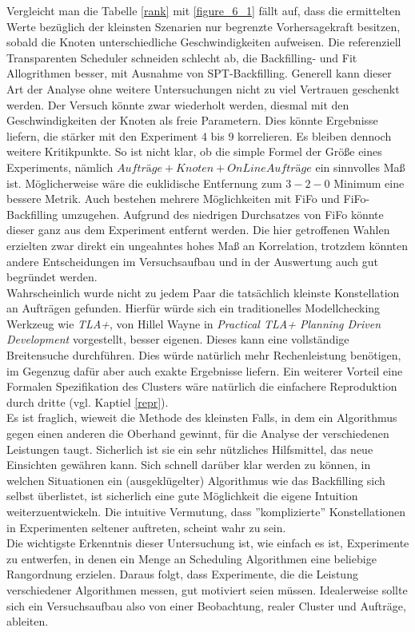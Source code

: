 Vergleicht man die Tabelle \ref{rank} mit \ref{figure_6_1} fällt auf, dass die ermittelten Werte bezüglich der kleinsten Szenarien nur begrenzte Vorhersagekraft besitzen, sobald die Knoten unterschiedliche Geschwindigkeiten aufweisen. Die referenziell Transparenten Scheduler schneiden schlecht ab, die Backfilling- und Fit Allogrithmen besser, mit Ausnahme von SPT-Backfilling. Generell kann dieser Art der Analyse ohne weitere Untersuchungen nicht zu viel Vertrauen geschenkt werden. Der Versuch könnte zwar wiederholt werden, diesmal mit den Geschwindigkeiten der Knoten als freie Parametern. Dies könnte Ergebnisse liefern, die stärker mit den Experiment 4 bis 9 korrelieren. Es bleiben dennoch weitere Kritikpunkte. So ist nicht klar, ob die simple Formel der Größe eines Experiments, nämlich $Aufträge + Knoten + OnLine Aufträge$ ein sinnvolles Maß ist. Möglicherweise wäre die euklidische Entfernung zum $3-2-0$ Minimum eine bessere Metrik. Auch bestehen mehrere Möglichkeiten mit FiFo und FiFo-Backfilling umzugehen. Aufgrund des niedrigen Durchsatzes von FiFo könnte dieser ganz aus dem Experiment entfernt werden. Die hier getroffenen Wahlen erzielten zwar direkt ein ungeahntes hohes Maß an Korrelation, trotzdem könnten andere Entscheidungen im Versuchsaufbau und in der Auswertung auch gut begründet werden.\\
Wahrscheinlich wurde nicht zu jedem Paar die tatsächlich kleinste Konstellation an Aufträgen gefunden. Hierfür würde sich ein traditionelles Modellchecking Werkzeug wie \emph{TLA+}, von Hillel Wayne in \emph{Practical TLA+ Planning Driven Development} \cite{Wayne2018} vorgestellt, besser eigenen.  Dieses kann eine vollständige Breitensuche durchführen. Dies würde natürlich mehr Rechenleistung benötigen, im Gegenzug dafür aber auch exakte Ergebnisse liefern. Ein weiterer Vorteil eine Formalen Spezifikation des Clusters wäre natürlich die einfachere Reproduktion durch dritte (vgl. Kaptiel \ref{repr}).\\
Es ist fraglich, wieweit die Methode des kleinsten Falls, in dem ein Algorithmus gegen einen anderen die Oberhand gewinnt, für die Analyse der verschiedenen Leistungen taugt. Sicherlich ist sie ein sehr nützliches Hilfsmittel, das neue Einsichten gewähren kann. Sich schnell darüber klar werden zu können, in welchen Situationen ein (ausgeklügelter) Algorithmus wie das Backfilling sich selbst überlistet, ist sicherlich eine gute Möglichkeit die eigene Intuition weiterzuentwickeln. Die intuitive Vermutung, dass ''komplizierte'' Konstellationen in Experimenten seltener auftreten, scheint wahr zu sein.\\

Die wichtigste Erkenntnis dieser Untersuchung ist, wie einfach es ist, Experimente zu entwerfen, in denen ein Menge an Scheduling Algorithmen eine beliebige Rangordnung erzielen. Daraus folgt, dass Experimente, die die Leistung verschiedener Algorithmen messen, gut motiviert seien müssen. Idealerweise sollte sich ein Versuchsaufbau also von einer Beobachtung, realer Cluster und Aufträge, ableiten.

\FloatBarrier

